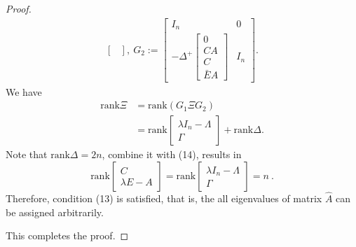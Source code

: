 \documentclass[english]{cccconf}
\theoremstyle{definition}
\newtheorem{remark}{Remark}
\begin{document}
\begin{proof}
\begin{align*}
\begin{bmatrix}
\end{bmatrix},\ G_2:=\begin{bmatrix}
I_n&0\\-\Delta^+\begin{bmatrix}
0\\CA\\C\\\bar{E}A
\end{bmatrix}&I_n
\end{bmatrix}.
\end{align*}
We have
\begin{equation}\begin{split}
\textrm{rank}\Xi &=\textrm{rank}(G_1\Xi G_2)\\&=\textrm{rank}\begin{bmatrix}
\lambda I_n-\Lambda\\\Gamma
\end{bmatrix}+\textrm{rank}\Delta.
\end{split}\end{equation}
Note that $\textrm{rank}\Delta=2n$, combine it with (14), results in
\begin{equation}
\textrm{rank}\begin{bmatrix}
C\\\lambda E-A
\end{bmatrix}=\textrm{rank}\begin{bmatrix}
\lambda I_n-\Lambda\\\Gamma
\end{bmatrix}=n\ .
\end{equation}
Therefore, condition (13) is satisfied, that is, the all eigenvalues of matrix $\hat{A}$ can be assigned arbitrarily.

This completes the proof.
\end{proof}


\end{document}
